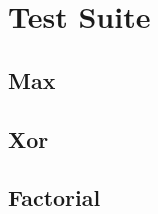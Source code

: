 \chapter{Test Suite}
\label{app:test-suite}

\section{Max}

        {\small\displayspacing}

\newpage
\section{Xor}

        {\small\displayspacing}

\newpage
\section{Factorial}

        {\small\displayspacing}
